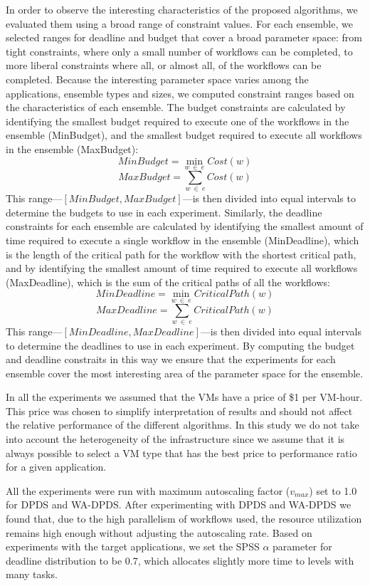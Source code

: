 \documentclass[conference]{IEEEtran}
\begin{document}
In order to observe the interesting characteristics of the proposed algorithms, we evaluated them using a broad range of constraint values. For each ensemble, we selected ranges for deadline and budget that cover a broad parameter space: from tight constraints, where only a small number of workflows can be completed, to more liberal constraints where all, or almost all, of the workflows can be completed. Because the interesting parameter space varies among the applications, ensemble types and sizes, we computed constraint ranges based on the characteristics of each ensemble. The budget constraints are calculated by identifying the smallest budget required to execute one of the workflows in the ensemble (MinBudget), and the smallest budget required to execute all workflows in the ensemble (MaxBudget): 
%
$$
MinBudget = \min_{w\ \in\ e}{Cost(w)}
$$
$$
MaxBudget = \sum_{w\ \in\ e}{Cost(w)}
$$
%
This range---$[MinBudget, MaxBudget]$---is then divided into equal intervals to determine the budgets to use in each experiment. Similarly, the deadline constraints for each ensemble are calculated by identifying the smallest amount of time required to execute a single workflow in the ensemble (MinDeadline), which is the length of the critical path for the workflow with the shortest critical path, and by identifying the smallest amount of time required to execute all workflows (MaxDeadline), which is the sum of the critical paths of all the workflows:
%
$$
MinDeadline = \min_{w\ \in\ e}{CriticalPath(w)}
$$
$$
MaxDeadline = \sum_{w\ \in\ e}{CriticalPath(w)}
$$
%
This range---$[MinDeadline, MaxDeadline]$---is then divided into equal intervals to determine the deadlines to use in each experiment. By computing the budget and deadline constraits in this way we ensure that the experiments for each ensemble cover the most interesting area of the parameter space for the ensemble.

In all the experiments we assumed that the VMs have a price of \$1 per VM-hour. This price was chosen to simplify interpretation of results and should not affect the relative performance of the different algorithms. In this study we do not take into account the heterogeneity of the infrastructure since we assume that it is always possible to select a VM type that has the best price to performance ratio for a given application.

All the experiments were run with maximum autoscaling factor ($v_{max}$) set to 1.0 for DPDS and WA-DPDS. After experimenting with DPDS and WA-DPDS we found that, due to the high parallelism of workflows used, the resource utilization remains high enough without adjusting the autoscaling rate. Based on experiments with the target applications, we set the SPSS $\alpha$ parameter for deadline distribution to be 0.7, which allocates slightly more time to levels with many tasks.
\end{document}

